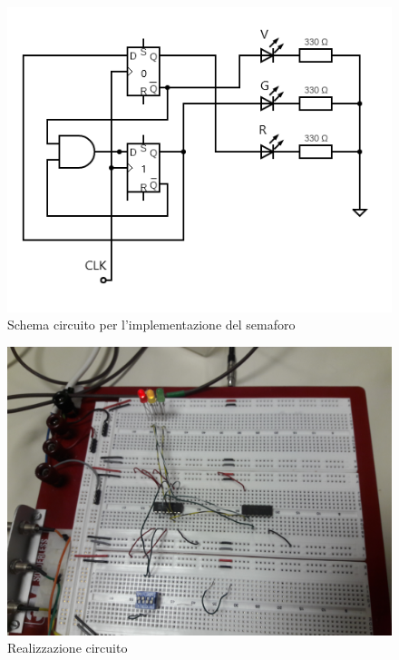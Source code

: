 \documentclass[10pt,a4paper]{article}
\begin{document}
\begin{figure}[h]

			\centering

			\includegraphics[scale=0.85]{circuit}

			\caption{ Schema circuito per l'implementazione del semaforo}

			\label{fig:circ}

\end{figure}

\begin{figure}[h]

			\centering

			\includegraphics[scale=0.07]{gr}

			\caption{ Realizzazione circuito}

			\label{fig:vg}

\end{figure}
\end{document}
